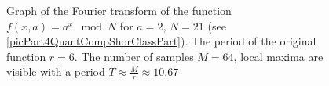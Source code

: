 \begin{figure}
\centering



\caption{Graph of the Fourier transform of the function 
  $f\left(x, a\right) = a^x \mod{N}$ for $a=2$, $N = 21$
  (see \autoref{picPart4QuantCompShorClassPart}). The period of the original
  function $r = 6$. The number of samples $M = 64$, local maxima are visible
  with a period $T \approx \frac{M}{r} \approx 10.67$}
\label{picPart4QuantCompShorClassPartFourier}
\end{figure}